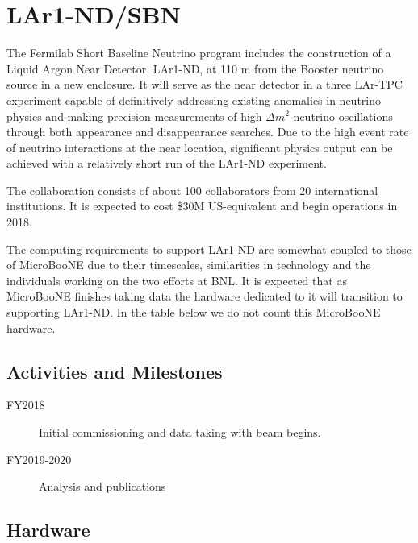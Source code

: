 \documentclass[pdftex,12pt,letter]{article}
\begin{document}
\pagebreak
\section{LAr1-ND/SBN}



The Fermilab Short Baseline Neutrino program includes the construction
of a Liquid Argon Near Detector, LAr1-ND, at 110 m from the Booster
neutrino source in a new enclosure.
It will serve as the near detector in a three LAr-TPC experiment
capable of definitively addressing existing anomalies in neutrino
physics and making precision measurements of high-$\Delta m^2$
neutrino oscillations through both appearance and disappearance
searches.
Due to the high event rate of neutrino interactions at the near
location, significant physics output can be achieved with a relatively
short run of the LAr1-ND experiment.  

The collaboration consists of about 100 collaborators from 20
international institutions.
It is expected to cost \$30M US-equivalent and begin operations in
2018. 

The computing requirements to support LAr1-ND are somewhat coupled to
those of MicroBooNE due to their timescales, similarities in
technology and the individuals working on the two efforts at BNL.
It is expected that as MicroBooNE finishes taking data the hardware
dedicated to it will transition to supporting LAr1-ND.
In the table below we do not count this MicroBooNE hardware.

\subsection{Activities and Milestones}

\begin{description}
\item[FY2018] Initial commissioning and data taking with beam begins.
\item[FY2019-2020] Analysis and publications
\end{description}

\subsection{Hardware}
\end{document}
